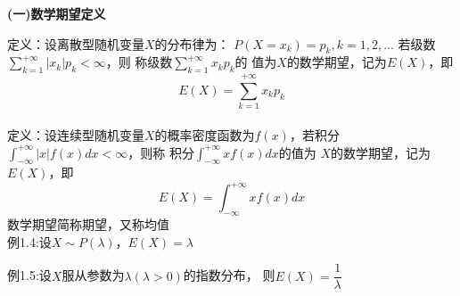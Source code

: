 \begin{center}
    \textbf{(一)数学期望定义}
\end{center}
定义：设离散型随机变量$X$的分布律为：
$P(X=x_k)=p_k,k=1,2,...$
若级数$\sum\limits_{k=1}^{+\infty}|x_k|p_k<\infty$，则
称级数$\sum\limits_{k=1}^{+\infty}x_kp_k$的
值为$X$的数学期望，记为$E(X)$，即
$$E(X)=\sum_{k=1}^{+\infty}x_kp_k$$
~\\

定义：设连续型随机变量$X$的概率密度函数为$f(x)$，若积分
$\int_{-\infty}^{+\infty}|x|f(x)dx<\infty$，则称
积分$\int_{-\infty}^{+\infty}xf(x)dx$的值为
$X$的数学期望，记为$E(X)$，即
$$E(X)=\int_{-\infty}^{+\infty}xf(x)dx$$
数学期望简称期望，又称均值
~\\

例1.4:设$X\sim P(\lambda)$，$E(X)=\lambda$

例1.5:设$X$服从参数为$\lambda(\lambda >0)$的指数分布，
则$E(X)=\dfrac{1}{\lambda}$